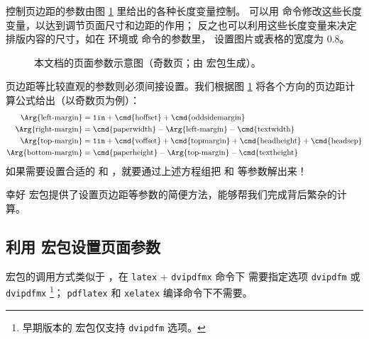 控制页边距的参数由图 \ref{fig:layouts} 里给出的各种长度变量控制。
可以用  命令修改这些长度变量，以达到调节页面尺寸和边距的作用；
反之也可以利用这些长度变量来决定排版内容的尺寸，如在  环境或  命令的参数里，
设置图片或表格的宽度为 0.8。

\begin{figure}[!p]
\centering
\layoutpicture*
\caption{本文档的页面参数示意图（奇数页；由  宏包生成）。} \label{fig:layouts}
\end{figure}

页边距等比较直观的参数则必须间接设置。我们根据图 \ref{fig:layouts} 将各个方向的页边距计算公式给出（以奇数页为例）：
\begin{align*}
\text{\Arg{left-margin}}   &= \text{\ttfamily 1in}
                            + \text{\cmd{hoffset}}
                            + \text{\cmd{oddsidemargin}} \\
\text{\Arg{right-margin}}  &= \text{\cmd{paperwidth}}
                            - \text{\Arg{left-margin}}
                            - \text{\cmd{textwidth}} \\
\text{\Arg{top-margin}}    &= \text{\ttfamily 1in}
                            + \text{\cmd{voffset}}
                            + \text{\cmd{topmargin}}
                            + \text{\cmd{headheight}}
                            + \text{\cmd{headsep}} \\
\text{\Arg{bottom-margin}} &= \text{\cmd{paperheight}}
                            - \text{\Arg{top-margin}}
                            - \text{\cmd{textheight}}
\end{align*}
如果需要设置合适的  和 ，就要通过上述方程组把  和  等参数解出来！

幸好  宏包提供了设置页边距等参数的简便方法，能够帮我们完成背后繁杂的计算。

\subsection{利用  宏包设置页面参数}\label{subsec:geometry}

 宏包的调用方式类似于 ，在 \texttt{latex} + \texttt{dvipdfmx} 命令下
需要指定选项 \texttt{dvipdfm} 或 \texttt{dvipdfmx}%
\footnote{早期版本的  宏包仅支持 \texttt{dvipdfm} 选项。}；
\texttt{pdflatex} 和 \texttt{xelatex} 编译命令下不需要。

